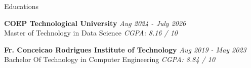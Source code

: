\documentclass{resume}
\begin{document}
\begin{rSection}{Educations}

{\bf COEP Technological University} \hfill {\em Aug 2024 - July 2026} \\
Master of Technology in Data Science \hfill {\em CGPA: 8.16 / 10}

\vspace{0.15cm}
{\bf Fr. Conceicao Rodrigues Institute of Technology} \hfill {\em Aug 2019 - May 2023} \\
Bachelor Of Technology in Computer Engineering \hfill {\em CGPA: 8.84 / 10}

\end{rSection}
\end{document}
